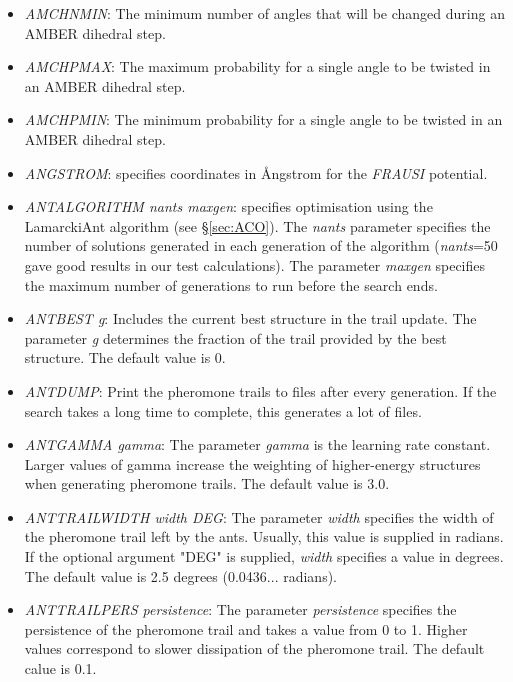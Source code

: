 \documentclass[12pt,a4paper,dvips]{article}
\begin{document}
\begin{itemize}
\item {\it AMCHNMIN\/}: The minimum number of angles that will be changed during an AMBER dihedral step.

\item {\it AMCHPMAX\/}: The maximum probability for a single angle to be twisted in an AMBER dihedral step.

\item {\it AMCHPMIN\/}: The minimum probability for a single angle to be twisted in an AMBER dihedral step.

\item {\it ANGSTROM\/}: specifies coordinates in \AA ngstrom for the {\it FRAUSI\/}
potential.

\item {\it ANTALGORITHM nants maxgen}: specifies optimisation using the LamarckiAnt algorithm
(see \S \ref{sec:ACO}). The {\it nants} parameter specifies the number of solutions
generated in each generation of the algorithm ({\it nants}=50 gave good results
in our test calculations). The parameter {\it maxgen} specifies the maximum number
of generations to run before the search ends.

\item {\it ANTBEST g}: Includes the current best structure in the trail update.
The parameter {\it g} determines the fraction of the trail provided by the best
structure. The default value is 0.

\item {\it ANTDUMP\/}: Print the pheromone trails to files after every generation.
If the search takes a long time to complete, this generates a lot of files.

\item {\it ANTGAMMA gamma}: The parameter {\it gamma} is the learning rate constant.
Larger values of gamma increase the weighting of higher-energy structures when
generating pheromone trails. The default value is 3.0.

\item {\it ANTTRAILWIDTH width DEG}: The parameter {\it width} specifies the
width of the pheromone trail left by the ants. Usually, this value is supplied in
radians. If the optional argument "DEG" is supplied, {\it width} specifies a
value in degrees. The default value is 2.5 degrees (0.0436... radians).

\item {\it ANTTRAILPERS persistence}: The parameter {\it persistence} specifies the
persistence of the pheromone trail and takes a value from 0 to 1. Higher values
correspond to slower dissipation of the pheromone trail. The default calue is 0.1.


\end{itemize}
\end{document}
